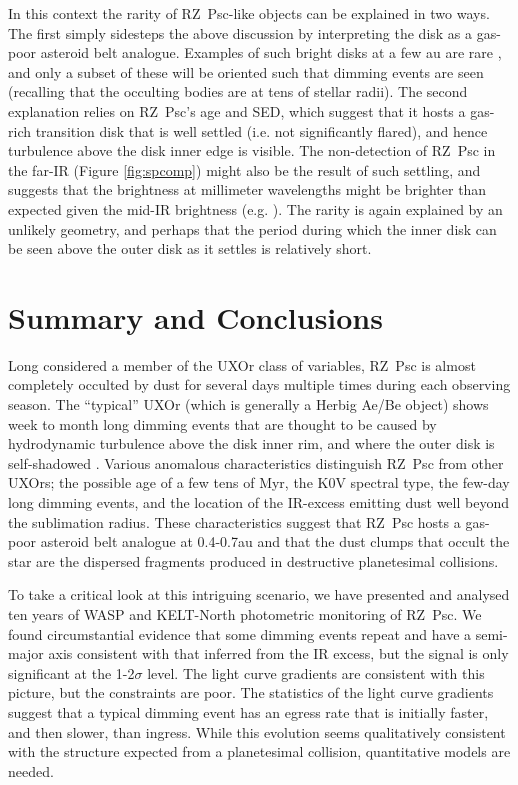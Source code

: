 \documentclass[]{rsos}
\begin{document}
In this context the rarity of RZ~Psc-like objects can be explained in two ways. The first
simply sidesteps the above discussion by interpreting the disk as a gas-poor asteroid
belt analogue. Examples of such bright disks at a few au are rare
\cite{2013MNRAS.433.2334K}, and only a subset of these will be oriented such that
dimming events are seen (recalling that the occulting bodies are at tens of stellar
radii). The second explanation relies on RZ~Psc's age and SED, which suggest that it
hosts a gas-rich transition disk that is well settled (i.e. not significantly flared),
and hence turbulence above the disk inner edge is visible. The non-detection of RZ~Psc in
the far-IR (Figure \ref{fig:spcomp}) might also be the result of such settling, and
suggests that the brightness at millimeter wavelengths might be brighter than expected
given the mid-IR brightness (e.g. \cite{2007prpl.conf..555D}). The rarity is again
explained by an unlikely geometry, and perhaps that the period during which the inner
disk can be seen above the outer disk as it settles is relatively short.

\section{Summary and Conclusions}\label{s:conc}

Long considered a member of the UXOr class of variables, RZ~Psc is almost completely
occulted by dust for several days multiple times during each observing season. The
``typical'' UXOr (which is generally a Herbig Ae/Be object) shows week to month long
dimming events that are thought to be caused by hydrodynamic turbulence above the disk
inner rim, and where the outer disk is self-shadowed \cite{2003ApJ...594L..47D}. Various
anomalous characteristics distinguish RZ~Psc from other UXOrs; the possible age of a few
tens of Myr, the K0V spectral type, the few-day long dimming events, and the location of
the IR-excess emitting dust well beyond the sublimation radius. These characteristics
suggest that RZ~Psc hosts a gas-poor asteroid belt analogue at 0.4-0.7au and that the
dust clumps that occult the star are the dispersed fragments produced in destructive
planetesimal collisions.

To take a critical look at this intriguing scenario, we have presented and analysed ten
years of WASP and KELT-North photometric monitoring of RZ~Psc. We found circumstantial
evidence that some dimming events repeat and have a semi-major axis consistent with that
inferred from the IR excess, but the signal is only significant at the 1-2$\sigma$
level. The light curve gradients are consistent with this picture, but the constraints
are poor. The statistics of the light curve gradients suggest that a typical dimming
event has an egress rate that is initially faster, and then slower, than ingress. While
this evolution seems qualitatively consistent with the structure expected from a
planetesimal collision, quantitative models are needed.
\end{document}
